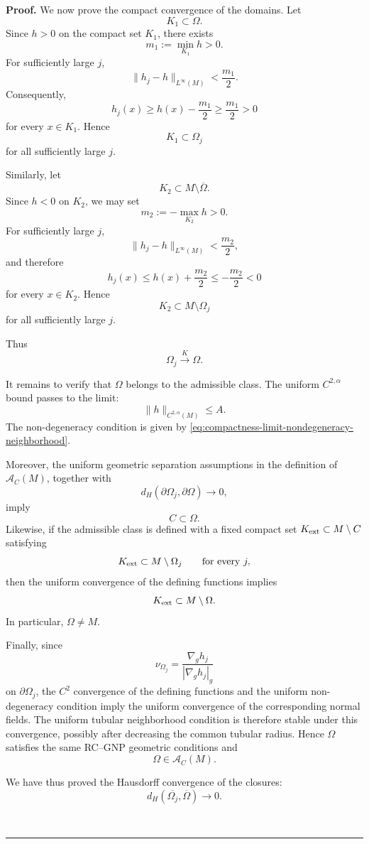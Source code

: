 \documentclass{article}
\newenvironment{proof}[1][Proof]{\textbf{#1.} }{\ \rule{0.5em}{0.5em}}
\begin{document}
\begin{proof}
We now prove the compact convergence of the domains. Let
\[
K_1\subset\Omega.
\]
Since $h>0$ on the compact set $K_1$, there exists
\[
m_1:=\min_{K_1}h>0.
\]
For sufficiently large $j$,
\[
\|h_j-h\|_{L^\infty(M)}<\frac{m_1}{2}.
\]
Consequently,
\[
h_j(x)
\ge h(x)-\frac{m_1}{2}
\ge\frac{m_1}{2}>0
\]
for every $x\in K_1$. Hence
\[
K_1\subset\Omega_j
\]
for all sufficiently large $j$.

Similarly, let
\[
K_2\subset M\setminus\overline{\Omega}.
\]
Since $h<0$ on $K_2$, we may set
\[
m_2:=-\max_{K_2}h>0.
\]
For sufficiently large $j$,
\[
\|h_j-h\|_{L^\infty(M)}<\frac{m_2}{2},
\]
and therefore
\[
h_j(x)
\le h(x)+\frac{m_2}{2}
\le-\frac{m_2}{2}<0
\]
for every $x\in K_2$. Hence
\[
K_2\subset M\setminus\Omega_j
\]
for all sufficiently large $j$.

Thus
\begin{equation}
\Omega_j\overset{K}{\longrightarrow}\Omega.
\label{eq:compactness-K-final}
\end{equation}

It remains to verify that $\Omega$ belongs to the admissible class.
The uniform $C^{2,\alpha}$ bound passes to the limit:
\[
\|h\|_{C^{2,\alpha}(M)}\le A.
\]
The non-degeneracy condition is given by
\eqref{eq:compactness-limit-nondegeneracy-neighborhood}.

Moreover, the uniform geometric separation assumptions in the
definition of $\mathcal A_C(M)$, together with
\[
d_H(\partial\Omega_j,\partial\Omega)\to0,
\]
imply
\[
C\subset\Omega.
\]
Likewise, if the admissible class is defined with a fixed compact set
$K_{\rm ext}\subset M\setminus C$ satisfying
\[
K_{\rm ext}\subset M\setminus\Omega_j
\qquad\text{for every }j,
\]
then the uniform convergence of the defining functions implies
\[
K_{\rm ext}\subset M\setminus\Omega.
\]
In particular, $\Omega\neq M$.

Finally, since
\[
\nu_{\Omega_j}
=
\frac{\nabla_g h_j}
{|\nabla_g h_j|_g}
\]
on $\partial\Omega_j$, the $C^2$ convergence of the defining
functions and the uniform non-degeneracy condition imply the uniform
convergence of the corresponding normal fields. The uniform tubular
neighborhood condition is therefore stable under this convergence,
possibly after decreasing the common tubular radius. Hence $\Omega$
satisfies the same RC--GNP geometric conditions and
\[
\Omega\in\mathcal A_C(M).
\]

We have thus proved the Hausdorff convergence of the closures:
\[
d_H(\overline{\Omega_j},\overline{\Omega})
\longrightarrow0.
\]


\end{proof}
\end{document}
